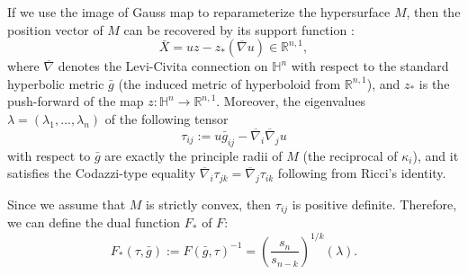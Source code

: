 \documentclass[10pt,a4paper]{amsart}
\newcommand{\R}{\ensuremath{\mathbb{R}}}
\renewcommand{\H}{{\mathbb{H}}}
\newcommand{\bnabla}{\overline{\nabla}}
\newcommand{\bg}{\bar{g}}
\numberwithin{equation}{section}
\begin{document}
If we use the image of Gauss map to reparameterize the hypersurface \(M\), then the position vector of \(M\) can be recovered by its support function \cite{co-compact}:
\begin{equation}
    \bar{X} = uz - z_{*}(\bnabla u) \in \R^{n,1},
\end{equation}
where $\bnabla$ denotes the Levi-Civita connection on \(\H^n\) with respect to the standard hyperbolic metric \(\bg\) (the induced metric of hyperboloid from \(\R^{n,1}\)), and $z_*$ is the push-forward of the map $z:\H^n\rightarrow \R^{n,1}$.  
Moreover, the eigenvalues \( \lambda=(\lambda_1,\dots,\lambda_n)\) of the following tensor
\begin{equation}
    \tau_{ij} := u \bg_{ij} - \bnabla_i \bnabla_j u
\end{equation}
with respect  to \(\bg\) are exactly the principle radii of \(M\) (the reciprocal  of \(\kappa_i\)), and it satisfies the Codazzi-type equality \(\bnabla_i \tau_{jk} = \bnabla_{j}\tau_{ik}\) following from Ricci's identity. 


\par Since we assume that $M$ is strictly convex, then  \(\tau_{ij}\) is positive definite. Therefore, we can define the dual function \(F_{*}\) of \(F\): 
\[F_{*}(\tau,\bar{g}) := F(\bar{g},\tau)^{-1}=\left(\frac{s_n}{s_{n-k}}\right)^{1/k}(\lambda).\]
\end{document}

